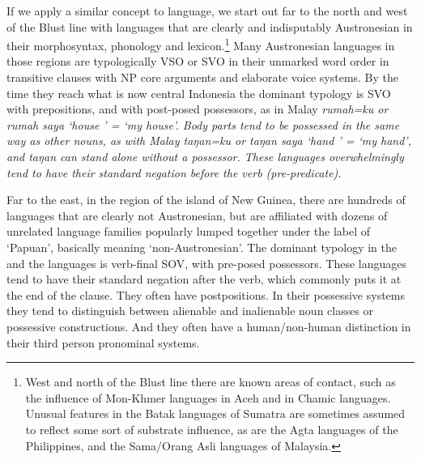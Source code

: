 If we apply a similar concept to language,
we start out far to the north
and west of the Blust line with languages that are clearly
and indisputably Austronesian in their morphosyntax,
phonology and lexicon.\footnote{
West and north of the Blust line
there are known areas of contact,
such as the influence of Mon-Khmer languages in Aceh
and in Chamic languages.
Unusual features in the Batak languages of Sumatra are sometimes
assumed to reflect some sort of substrate influence,
as are the Agta languages of the Philippines,
and the Sama/Orang Asli languages of Malaysia.}
Many Austronesian
languages in those regions are typologically VSO or SVO in their
unmarked word order in transitive clauses with NP core arguments
and elaborate voice systems.
By the time they reach what is now central Indonesia the dominant
typology is SVO with prepositions,
and with post-posed possessors,
as in Malay \it{rumah=ku} or \it{rumah saya} ‘house ’ = ‘my house’.
Body parts tend to be possessed in the same way as other nouns,
as with Malay \it{taŋan=ku} or \it{taŋan saya} ‘hand ’
= ‘my hand’, and \it{taŋan} can stand alone without a possessor.
These languages overwhelmingly tend to have their standard negation
before the verb (pre-predicate).

Far to the east,
in the region of the island of New Guinea,
there are hundreds of languages that are clearly not Austronesian,
but are affiliated with dozens of unrelated language families
popularly lumped together under the label of ‘Papuan’, basically meaning ‘non-Austronesian’.
The dominant typology in the 
and the  languages is verb-final SOV, with pre-posed possessors.
These languages tend to have their standard negation after the
verb, which commonly puts it at the end of the clause.
They often have postpositions.
In their possessive systems they tend to distinguish between
alienable and inalienable noun classes or possessive constructions.
And they often have a human/non-human distinction in their third person pronominal systems.

